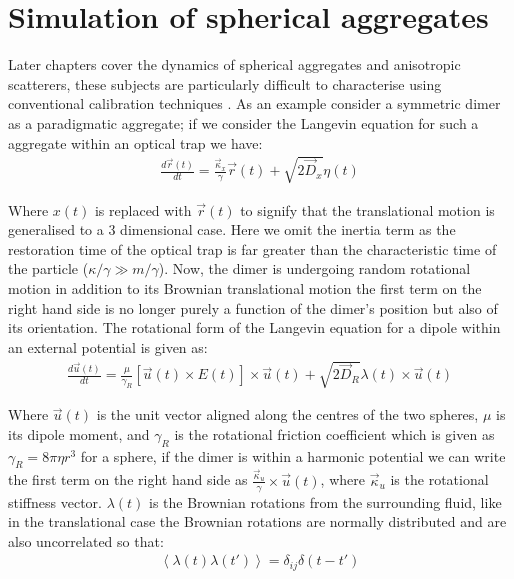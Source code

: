 \section{Simulation of spherical aggregates}
\label{sec:simulations}
Later chapters cover the dynamics of spherical aggregates and anisotropic 
scatterers, these subjects are particularly difficult to characterise 
using conventional calibration techniques \cite{Li2008, Yogesha2011PreciseCO}. 
As an example consider a symmetric dimer as a paradigmatic aggregate; 
if we consider the Langevin equation for such a aggregate within an optical 
trap we have:
\begin{align}
	\frac{{d}\vec{r}(t)}{{dt}} = \frac{\vec{\kappa}_x}{\gamma}\vec{r}(t) + 
	\sqrt{2\vec{D}_x}\eta(t)
\end{align}

Where $x(t)$ is replaced with $\vec{r}(t)$ to signify that the translational 
motion is generalised to a 3 dimensional case. Here we omit the inertia term 
as the restoration time of the optical trap is far greater than the characteristic
time of the particle ($\kappa/\gamma \gg m/\gamma$). Now, the dimer 
is undergoing random rotational motion in addition to its Brownian 
translational motion the first term on the right hand side is no longer 
purely a function of the dimer's position but also of its orientation. 
The rotational form of the Langevin equation for a dipole within an external 
potential is given as:
\begin{align}
  \frac{{d}\vec{u}(t)}{{dt}}
  =
  \frac{\mu}{\gamma_R}\left[\vec{u}(t)\times E(t)\right]\times \vec{u}(t)
  + \sqrt{2\vec{D}_R}\lambda(t)\times \vec{u}(t)
\end{align}

Where $\vec{u}(t)$ is the unit vector aligned along the centres of the 
two spheres, $\mu$ is its dipole moment, and $\gamma_R$ is the rotational 
friction coefficient which is given as $\gamma_R = 8\pi\eta r^3$ for a 
sphere, if the dimer is within a harmonic potential we can write the first 
term on the right hand side as $\frac{\vec{\kappa}_u}{\gamma} \times 
\vec{u}(t)$, where $\vec{\kappa}_u$ is the rotational stiffness vector. 
$\lambda(t)$ is the Brownian rotations from the surrounding fluid, 
like in the translational case the Brownian rotations are normally 
distributed and are also uncorrelated so that:
\begin{align}
  \left<\lambda(t)\lambda(t')\right> = \delta_{ij}\delta(t-t')
\end{align}

